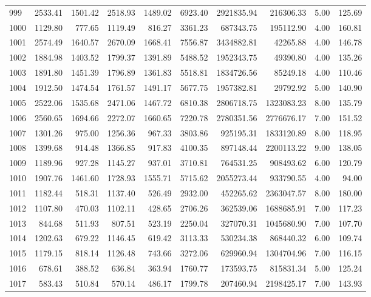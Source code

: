 \begin{tabular}{lrrrrrrrrr}
999 & 2533.41 & 1501.42 & 2518.93 & 1489.02 & 6923.40 & 2921835.94 & 216306.33 & 5.00 & 125.69 \\
1000 & 1129.80 & 777.65 & 1119.49 & 816.27 & 3361.23 & 687343.75 & 195112.90 & 4.00 & 160.81 \\
1001 & 2574.49 & 1640.57 & 2670.09 & 1668.41 & 7556.87 & 3434882.81 & 42265.88 & 4.00 & 146.78 \\
1002 & 1884.98 & 1403.52 & 1799.37 & 1391.89 & 5488.52 & 1952343.75 & 49390.80 & 4.00 & 135.26 \\
1003 & 1891.80 & 1451.39 & 1796.89 & 1361.83 & 5518.81 & 1834726.56 & 85249.18 & 4.00 & 110.46 \\
1004 & 1912.50 & 1474.54 & 1761.57 & 1491.17 & 5677.75 & 1957382.81 & 29792.92 & 5.00 & 140.90 \\
1005 & 2522.06 & 1535.68 & 2471.06 & 1467.72 & 6810.38 & 2806718.75 & 1323083.23 & 8.00 & 135.79 \\
1006 & 2560.65 & 1694.66 & 2272.07 & 1660.65 & 7220.78 & 2780351.56 & 2776676.17 & 7.00 & 151.52 \\
1007 & 1301.26 & 975.00 & 1256.36 & 967.33 & 3803.86 & 925195.31 & 1833120.89 & 8.00 & 118.95 \\
1008 & 1399.68 & 914.48 & 1366.85 & 917.83 & 4100.35 & 897148.44 & 2200113.22 & 9.00 & 138.05 \\
1009 & 1189.96 & 927.28 & 1145.27 & 937.01 & 3710.81 & 764531.25 & 908493.62 & 6.00 & 120.79 \\
1010 & 1907.76 & 1461.60 & 1728.93 & 1555.71 & 5715.62 & 2055273.44 & 933790.55 & 4.00 & 94.00 \\
1011 & 1182.44 & 518.31 & 1137.40 & 526.49 & 2932.00 & 452265.62 & 2363047.57 & 8.00 & 180.00 \\
1012 & 1107.80 & 470.03 & 1102.11 & 428.65 & 2706.26 & 362539.06 & 1688685.91 & 7.00 & 117.23 \\
1013 & 844.68 & 511.93 & 807.51 & 523.19 & 2250.04 & 327070.31 & 1045680.90 & 7.00 & 107.70 \\
1014 & 1202.63 & 679.22 & 1146.45 & 619.42 & 3113.33 & 530234.38 & 868440.32 & 6.00 & 109.74 \\
1015 & 1179.15 & 818.14 & 1126.48 & 743.66 & 3272.06 & 629960.94 & 1304704.96 & 7.00 & 116.15 \\
1016 & 678.61 & 388.52 & 636.84 & 363.94 & 1760.77 & 173593.75 & 815831.34 & 5.00 & 125.24 \\
1017 & 583.43 & 510.84 & 570.14 & 486.17 & 1799.78 & 207460.94 & 2198425.17 & 7.00 & 143.93 \\

\end{tabular}
